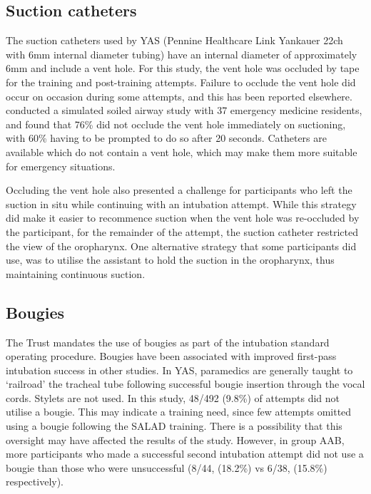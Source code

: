 \documentclass[]{article}
\begin{document}
\hypertarget{suction-catheters}{%
\subsection{Suction catheters}\label{suction-catheters}}

The suction catheters used by YAS (Pennine Healthcare Link Yankauer 22ch
with 6mm internal diameter tubing) have an internal diameter of
approximately 6mm and include a vent hole. For this study, the vent hole
was occluded by tape for the training and post-training attempts.
Failure to occlude the vent hole did occur on occasion during some
attempts, and this has been reported elsewhere.
\citet{cox_yankauer_2017} conducted a simulated soiled airway study with
37 emergency medicine residents, and found that 76\% did not occlude the
vent hole immediately on suctioning, with 60\% having to be prompted to
do so after 20 seconds. Catheters are available which do not contain a
vent hole, which may make them more suitable for emergency situations.

Occluding the vent hole also presented a challenge for participants who
left the suction in situ while continuing with an intubation attempt.
While this strategy did make it easier to recommence suction when the
vent hole was re-occluded by the participant, for the remainder of the
attempt, the suction catheter restricted the view of the oropharynx. One
alternative strategy that some participants did use, was to utilise the
assistant to hold the suction in the oropharynx, thus maintaining
continuous suction.

\hypertarget{bougies}{%
\subsection{Bougies}\label{bougies}}

The Trust mandates the use of bougies as part of the intubation standard
operating procedure. Bougies have been associated with improved
first-pass intubation success
\citep{kingma_comparison_2017, driver_bougie_2017} in other studies. In
YAS, paramedics are generally taught to `railroad' the tracheal tube
following successful bougie insertion through the vocal cords. Stylets
are not used. In this study, 48/492 (9.8\%) of attempts did not utilise
a bougie. This may indicate a training need, since few attempts omitted
using a bougie following the SALAD training. There is a possibility that
this oversight may have affected the results of the study. However, in
group AAB, more participants who made a successful second intubation
attempt did not use a bougie than those who were unsuccessful (8/44,
(18.2\%) vs 6/38, (15.8\%) respectively).
\end{document}
